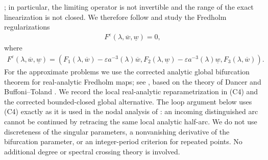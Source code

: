 \documentclass[11pt,reqno]{amsart}
\numberwithin{equation}{section}
\theoremstyle{definition}
\theoremstyle{remark}
\begin{document}
\cite[Section 2.4]{Hur11}; in particular, the limiting operator is
not invertible and the range of the exact linearization is not
closed.  We therefore follow \cite{Hur11} and study the Fredholm
regularizations
\begin{eqnarray}
 F^{\varepsilon}(\lambda,\overline{w},\underline{w})=0, \label{eq4.9}
\end{eqnarray}
where
\begin{eqnarray}
F^{\varepsilon}(\lambda,\overline{w},\underline{w})=(F_1(\lambda,\overline{w})-\varepsilon
a^{-3}(\lambda)\overline{w},F_2(\lambda,\underline{w})-\varepsilon
a^{-3}(\lambda) \underline{w},F_3(\lambda,\overline{w})).
\label{eq4.10}
\end{eqnarray}
For the approximate problems we use the corrected analytic global
bifurcation theorem for real-analytic Fredholm maps; see
\cite[Theorem 6 and Remarks 7--8]{ConstantinSV}, based on the theory
of Dancer and Buffoni--Toland \cite{Dancer,BuffoniT}.  We record the
local real-analytic reparametrization in (C4) and the corrected
bounded-closed global alternative.  The loop argument below uses
(C4) exactly as it is used in the nodal analysis of
\cite[Section 4]{ConstantinSV}: an incoming distinguished arc cannot
be continued by retracing the same local analytic half-arc.  We do
not use discreteness of the singular parameters, a nonvanishing
derivative of the bifurcation parameter, or an integer-period
criterion for repeated points.  No additional degree or spectral
crossing theory is involved.
\end{document}
